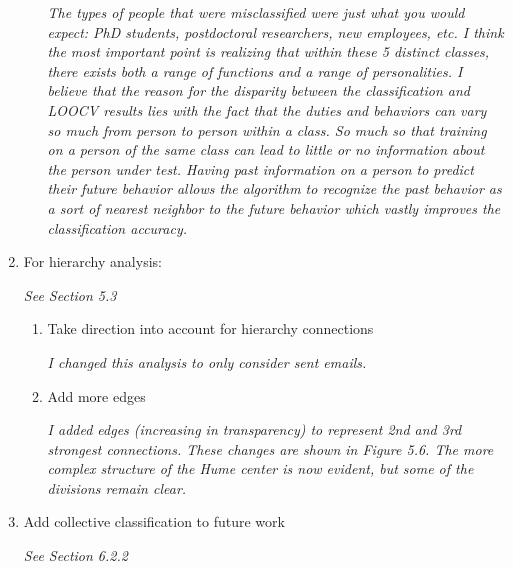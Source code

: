 \documentclass[12pt]{report}
\begin{document}
\begin{enumerate}
\begin{enumerate}
    		\par \textit{The types of people that were misclassified were just what you would expect: PhD students, postdoctoral researchers, new employees, etc.
    			I think the most important point is realizing that within these 5 distinct classes, there exists both a range of functions and a range of personalities.
    			I believe that the reason for the disparity between the classification and LOOCV results lies with the fact that the duties and behaviors can vary so much from person to person within a class.
    			So much so that training on a person of the same class can lead to little or no information about the person under test.
    			Having past information on a person to predict their future behavior allows the algorithm to recognize the past behavior as a sort of nearest neighbor to the future behavior which vastly improves the classification accuracy.}
    		    \end{enumerate}
	\item For hierarchy analysis:
	\par \textit{See Section 5.3}
	
	\begin{enumerate}
		\item Take direction into account for hierarchy connections
		
		\par \textit{I changed this analysis to only consider sent emails.}
		
		\item Add more edges
		
		\par \textit{I added edges (increasing in transparency) to represent 2nd and 3rd strongest connections. These changes are shown in Figure 5.6.  The more complex structure of the Hume center is now evident, but some of the divisions remain clear.}
	\end{enumerate}

	\item Add collective classification to future work
	\par \textit{See Section 6.2.2}

\end{enumerate}
\end{document}
